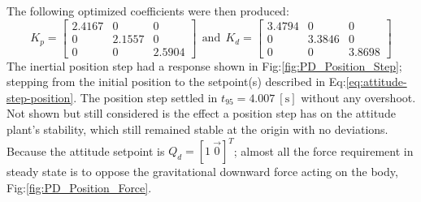 The following optimized coefficients were then produced:
\begin{equation}\label{eq:optimized-position-pd}
K_p = \begin{bmatrix}
2.4167 & 0 & 0\\
0 & 2.1557 & 0\\
0 & 0 & 2.5904
\end{bmatrix}
~~\text{and}~~K_d = \begin{bmatrix}
3.4794 & 0 & 0\\
0 & 3.3846 & 0\\
0 & 0 & 3.8698
\end{bmatrix}
\end{equation}
The inertial position step had a response shown in Fig:\ref{fig:PD_Position_Step}; stepping from the initial position to the setpoint(s) described in Eq:\ref{eq:attitude-step-position}. The position step settled in $t_{95}=4.007~[\text{s}]$ without any overshoot. Not shown but still considered is the effect a position step has on the attitude plant's stability, which still remained stable at the origin with no deviations. Because the attitude setpoint is $Q_d=[1~\vec{0}]^T$; almost all the force requirement in steady state is to oppose the gravitational downward force acting on the body, Fig:\ref{fig:PD_Position_Force}.
